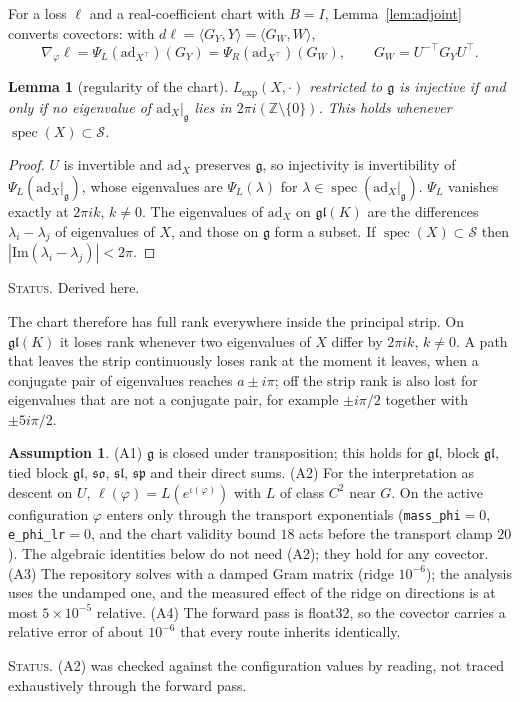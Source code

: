 \documentclass[11pt]{article}
\newtheorem{lemma}[theorem]{Lemma}
\theoremstyle{definition}
\newtheorem{assumption}[theorem]{Assumption}
\theoremstyle{remark}
\newcommand{\g}{\mathfrak{g}}
\newcommand{\gl}{\mathfrak{gl}}
\newcommand{\ad}{\mathrm{ad}}
\newcommand{\spec}{\operatorname{spec}}
\newcommand{\ip}[2]{\langle #1, #2\rangle}
\newcommand{\status}[1]{\par\smallskip\noindent\textsc{Status.} #1\par\smallskip}
\begin{document}
For a loss $\ell$ and a real-coefficient chart with $B=I$, Lemma~\ref{lem:adjoint} converts covectors: with $d\ell=\ip{G_Y}{Y}=\ip{G_W}{W}$,
\begin{equation}\label{eq:covectors}
\nabla_\varphi\ell=\Psi_L(\ad_{X^\top})(G_Y)=\Psi_R(\ad_{X^\top})(G_W),\qquad G_W=U^{-\top}G_YU^{\top}.
\end{equation}

\begin{lemma}[regularity of the chart]\label{lem:regular}
$L_{\exp}(X,\cdot)$ restricted to $\g$ is injective if and only if no eigenvalue of $\ad_X|_\g$ lies in $2\pi i(\mathbb{Z}\setminus\{0\})$. This holds whenever $\spec(X)\subset\mathcal{S}$.
\end{lemma}
\begin{proof}
$U$ is invertible and $\ad_X$ preserves $\g$, so injectivity is invertibility of $\Psi_L(\ad_X|_\g)$, whose eigenvalues are $\Psi_L(\lambda)$ for $\lambda\in\spec(\ad_X|_\g)$. $\Psi_L$ vanishes exactly at $2\pi ik$, $k\neq0$. The eigenvalues of $\ad_X$ on $\gl(K)$ are the differences $\lambda_i-\lambda_j$ of eigenvalues of $X$, and those on $\g$ form a subset. If $\spec(X)\subset\mathcal{S}$ then $|\mathrm{Im}(\lambda_i-\lambda_j)|<2\pi$.
\end{proof}
\status{Derived here.}

The chart therefore has full rank everywhere inside the principal strip. On $\gl(K)$ it loses rank whenever two eigenvalues of $X$ differ by $2\pi ik$, $k\neq0$. A path that leaves the strip continuously loses rank at the moment it leaves, when a conjugate pair of eigenvalues reaches $a\pm i\pi$; off the strip rank is also lost for eigenvalues that are not a conjugate pair, for example $\pm i\pi/2$ together with $\pm5i\pi/2$.

\begin{assumption}\label{ass:main}
(A1) $\g$ is closed under transposition; this holds for $\gl$, block $\gl$, tied block $\gl$, $\mathfrak{so}$, $\mathfrak{sl}$, $\mathfrak{sp}$ and their direct sums. (A2) For the interpretation as descent on $U$, $\ell(\varphi)=L(e^{\iota(\varphi)})$ with $L$ of class $C^2$ near $G$. On the active configuration $\varphi$ enters only through the transport exponentials (\texttt{mass\_phi}$=0$, \texttt{e\_phi\_lr}$=0$, and the chart validity bound $18$ acts before the transport clamp $20$). The algebraic identities below do not need (A2); they hold for any covector. (A3) The repository solves with a damped Gram matrix (ridge $10^{-6}$); the analysis uses the undamped one, and the measured effect of the ridge on directions is at most $5\times10^{-5}$ relative. (A4) The forward pass is float32, so the covector carries a relative error of about $10^{-6}$ that every route inherits identically.
\end{assumption}
\status{(A2) was checked against the configuration values by reading, not traced exhaustively through the forward pass.}
\end{document}
